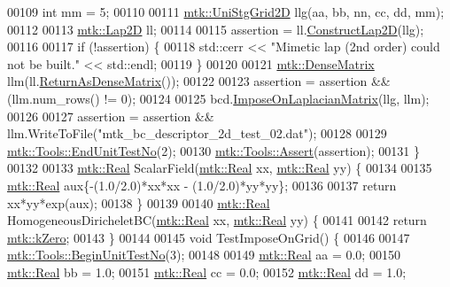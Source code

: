 \begin{DoxyCode}
00109   \textcolor{keywordtype}{int} mm = 5;
00110 
00111   \hyperlink{classmtk_1_1UniStgGrid2D}{mtk::UniStgGrid2D} llg(aa, bb, nn, cc, dd, mm);
00112 
00113   \hyperlink{classmtk_1_1Lap2D}{mtk::Lap2D} ll;
00114 
00115   assertion = ll.\hyperlink{classmtk_1_1Lap2D_a188ee8fee643463affca7de2884711b1}{ConstructLap2D}(llg);
00116 
00117   \textcolor{keywordflow}{if} (!assertion) \{
00118     std::cerr << \textcolor{stringliteral}{"Mimetic lap (2nd order) could not be built."} << std::endl;
00119   \}
00120 
00121   \hyperlink{classmtk_1_1DenseMatrix}{mtk::DenseMatrix} llm(ll.\hyperlink{classmtk_1_1Lap2D_aaac0a22eaa2f036869b24fd420ce5761}{ReturnAsDenseMatrix}());
00122 
00123   assertion = assertion && (llm.num\_rows() != 0);
00124 
00125   bcd.\hyperlink{classmtk_1_1BCDescriptor2D_a35592617dda3b965b680b2a1355122f4}{ImposeOnLaplacianMatrix}(llg, llm);
00126 
00127   assertion = assertion && llm.WriteToFile(\textcolor{stringliteral}{"mtk\_bc\_descriptor\_2d\_test\_02.dat"});
00128 
00129   \hyperlink{classmtk_1_1Tools_aba67d9dc35c9c1c49430fcc9ea035e03}{mtk::Tools::EndUnitTestNo}(2);
00130   \hyperlink{classmtk_1_1Tools_ac6804df469c94ab6a796fb64f1e44a89}{mtk::Tools::Assert}(assertion);
00131 \}
00132 
00133 \hyperlink{group__c01-roots_gac080bbbf5cbb5502c9f00405f894857d}{mtk::Real} ScalarField(\hyperlink{group__c01-roots_gac080bbbf5cbb5502c9f00405f894857d}{mtk::Real} xx, \hyperlink{group__c01-roots_gac080bbbf5cbb5502c9f00405f894857d}{mtk::Real} yy) \{
00134 
00135   \hyperlink{group__c01-roots_gac080bbbf5cbb5502c9f00405f894857d}{mtk::Real} aux\{-(1.0/2.0)*xx*xx - (1.0/2.0)*yy*yy\};
00136 
00137   \textcolor{keywordflow}{return} xx*yy*exp(aux);
00138 \}
00139 
00140 \hyperlink{group__c01-roots_gac080bbbf5cbb5502c9f00405f894857d}{mtk::Real} HomogeneousDiricheletBC(\hyperlink{group__c01-roots_gac080bbbf5cbb5502c9f00405f894857d}{mtk::Real} xx, \hyperlink{group__c01-roots_gac080bbbf5cbb5502c9f00405f894857d}{mtk::Real} yy) \{
00141 
00142   \textcolor{keywordflow}{return} \hyperlink{group__c01-roots_ga59a451a5fae30d59649bcda274fea271}{mtk::kZero};
00143 \}
00144 
00145 \textcolor{keywordtype}{void} TestImposeOnGrid() \{
00146 
00147   \hyperlink{classmtk_1_1Tools_afc29ecaf337a13ed2e817d3890a5a441}{mtk::Tools::BeginUnitTestNo}(3);
00148 
00149   \hyperlink{group__c01-roots_gac080bbbf5cbb5502c9f00405f894857d}{mtk::Real} aa = 0.0;
00150   \hyperlink{group__c01-roots_gac080bbbf5cbb5502c9f00405f894857d}{mtk::Real} bb = 1.0;
00151   \hyperlink{group__c01-roots_gac080bbbf5cbb5502c9f00405f894857d}{mtk::Real} cc = 0.0;
00152   \hyperlink{group__c01-roots_gac080bbbf5cbb5502c9f00405f894857d}{mtk::Real} dd = 1.0;

\end{DoxyCode}

